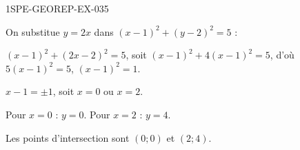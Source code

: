 \begin{corrige}{1SPE-GEOREP-EX-035}


On substitue $y = 2x$ dans $(x-1)^2 + (y-2)^2 = 5$ :

$(x-1)^2 + (2x-2)^2 = 5$, soit $(x-1)^2 + 4(x-1)^2 = 5$, d'où $5(x-1)^2 = 5$, $(x-1)^2 = 1$.

$x - 1 = \pm 1$, soit $x = 0$ ou $x = 2$.

Pour $x = 0$ : $y = 0$. Pour $x = 2$ : $y = 4$.

Les points d'intersection sont $\boxed{(0 ; 0)}$ et $\boxed{(2 ; 4)}$.

\end{corrige}
